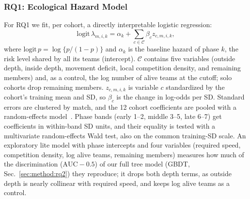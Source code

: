 \documentclass[conference]{IEEEtran}
\begin{document}
\subsubsection{RQ1: Ecological Hazard Model}
\label{sec:method:rq1}
For RQ1 we fit, per cohort, a directly interpretable logistic regression:
\begin{equation}
\mathrm{logit}\,\lambda_{m,i,k}=\alpha_k+\textstyle\sum_{c\in\mathcal{C}}\beta_c z_{c,m,i,k},
\label{eq:ehm}
\end{equation}
where $\mathrm{logit}\,p=\log\{p/(1-p)\}$ and $\alpha_k$ is the baseline hazard of phase $k$, the risk level shared by all its teams (intercept).
$\mathcal{C}$ contains five variables (outside depth, inside depth, movement deficit, local competition density, and remaining members) and, as a control, the log number of alive teams at the cutoff; solo cohorts drop remaining members.
$z_{c,m,i,k}$ is variable $c$ standardized by the cohort's training mean and SD, so $\beta_c$ is the change in log-odds per SD.
Standard errors are clustered by match, and the 12 cohort coefficients are pooled with a random-effects model~\cite{DerSimonian86}.
Phase bands (early 1--2, middle 3--5, late 6--7) get coefficients in within-band SD units, and their equality is tested with a multivariate random-effects Wald test, also on the common training-SD scale.
An exploratory lite model with phase intercepts and four variables (required speed, competition density, log alive teams, remaining members) measures how much of the discrimination ($\mathrm{AUC}-0.5$) of our full tree model (GBDT, Sec.~\ref{sec:method:rq2}) they reproduce; it drops both depth terms, as outside depth is nearly collinear with required speed, and keeps log alive teams as a control.
\end{document}
